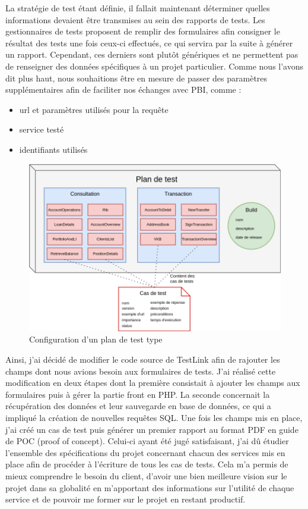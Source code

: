 	La stratégie de test étant définie, il fallait maintenant déterminer quelles informations devaient être transmises au sein des rapports de tests. Les gestionnaires de tests proposent de remplir des formulaires afin consigner le résultat des tests une fois ceux-ci effectués, ce qui servira par la suite à générer un rapport. Cependant, ces derniers sont plutôt génériques et ne permettent pas de renseigner des données spécifiques à un projet particulier. Comme nous l'avons dit plus haut, nous souhaitions être en mesure de passer des paramètres supplémentaires afin de faciliter nos échanges avec PBI, comme : \\
	
	\begin{itemize}
		\item url et paramètres utilisés pour la requête
		\item service testé
		\item identifiants utilisés
	\end{itemize}
	
	\begin{figure}[h!]
	\includegraphics[scale=0.5]{images/travailNeuflizeOBC/architecture/testlink.png}
	\centering
	\caption{Configuration d'un plan de test type}
	\label{testlink}
\end{figure}
	
	Ainsi, j'ai décidé de modifier le code source de TestLink afin de rajouter les champs dont nous avions besoin aux formulaires de tests. J'ai réalisé cette modification en deux étapes dont la première consistait à ajouter les champs aux formulaires puis à gérer la partie front en PHP. La seconde concernait la récupération des données et leur sauvegarde en base de données, ce qui a impliqué la création de nouvelles requêtes SQL. Une fois les champs mis en place, j'ai créé un cas de test puis générer un premier rapport au format PDF en guide de POC (proof of concept). Celui-ci ayant été jugé satisfaisant, j'ai dû étudier l'ensemble des spécifications du projet concernant chacun des services mis en place afin de procéder à l'écriture de tous les cas de tests. Cela m'a permis de mieux comprendre le besoin du client, d'avoir une bien meilleure vision sur le projet dans sa globalité en m'apportant des informations sur l'utilité de chaque service et de pouvoir me former sur le projet en restant productif.
	
